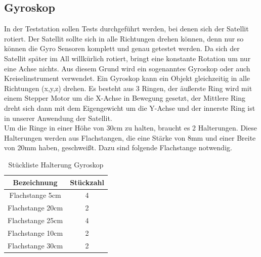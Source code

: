 \subsection{Gyroskop}\label{sec:gyroskop}
In der Teststation sollen Tests durchgeführt werden, bei denen sich der Satellit rotiert. Der Satellit sollte sich in alle Richtungen drehen können, denn nur so können die Gyro Sensoren komplett und genau getestet werden. Da sich der Satellit später im All willkürlich rotiert, bringt eine konstante Rotation um nur eine Achse nichts. Aus diesem Grund wird ein sogenanntes Gyroskop oder auch Kreiselinstrument verwendet. Ein Gyroskop kann ein Objekt gleichzeitig in alle Richtungen (x,y,z) drehen. Es besteht aus 3 Ringen, der äußerste Ring wird mit einem Stepper Motor um die X-Achse in Bewegung gesetzt, der Mittlere Ring dreht sich dann mit dem Eigengewicht um die Y-Achse und der innerste Ring ist in unserer Anwendung der Satellit. \\ 
\vspace{3mm}
Um die Ringe in einer Höhe von 30cm zu halten, braucht es 2 Halterungen. Diese Halterungen werden aus Flachstangen, die eine Stärke von 8mm und einer Breite von 20mm haben, geschweißt. Dazu sind folgende Flachstange notwendig. \\
\vspace{3mm}
\begin{table}[H]
    \centering
    \begin{tabular}{ | c | c | } 
  \hline
   \textbf{Bezeichnung} & \textbf{Stückzahl}\\ 
  \hline
   Flachstange 5cm & 4\\ 
  \hline
   Flachstange 20cm & 2 \\ 
  \hline
  Flachstange 25cm & 4 \\ 
  \hline
  Flachstange 10cm & 2 \\ 
  \hline
  Flachstange 30cm & 2 \\ 
  \hline
\end{tabular}
    \caption{Stückliste Halterung Gyroskop}
\end{table}
\vspace{3mm}
